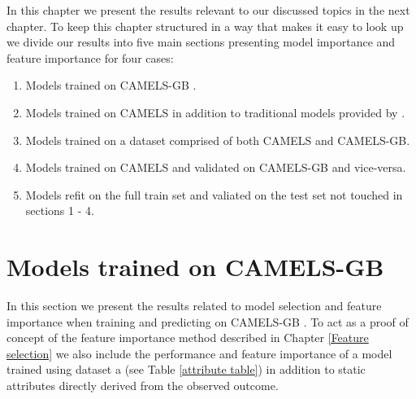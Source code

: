 In this chapter we present the results relevant to our discussed topics in the 
next chapter. To keep this chapter structured in a way that makes it easy to 
look up we divide our results into five main sections presenting model importance 
and feature importance for four cases:
\begin{enumerate}
    \item Models trained on CAMELS-GB \citep{CAMELS_GB}.
    \item Models trained on CAMELS \citep{CAMELS_US} in addition to traditional 
        models provided by \citationneeded.
    \item Models trained on a dataset comprised of both CAMELS and CAMELS-GB.
    \item Models trained on CAMELS and validated on CAMELS-GB and vice-versa.
    \item Models refit on the full train set and valiated on the test set not 
        touched in sections 1 - 4.
\end{enumerate}

\section{Models trained on CAMELS-GB}
In this section we present the results related to model selection and feature 
importance when training and predicting on CAMELS-GB \citep{CAMELS_GB}. To act 
as a proof of concept of the feature importance method described in Chapter 
\ref{Feature selection} we also include the performance and feature importance of 
a model trained using dataset a (see Table \ref{attribute table}) in addition to
static attributes directly derived from the observed outcome.

